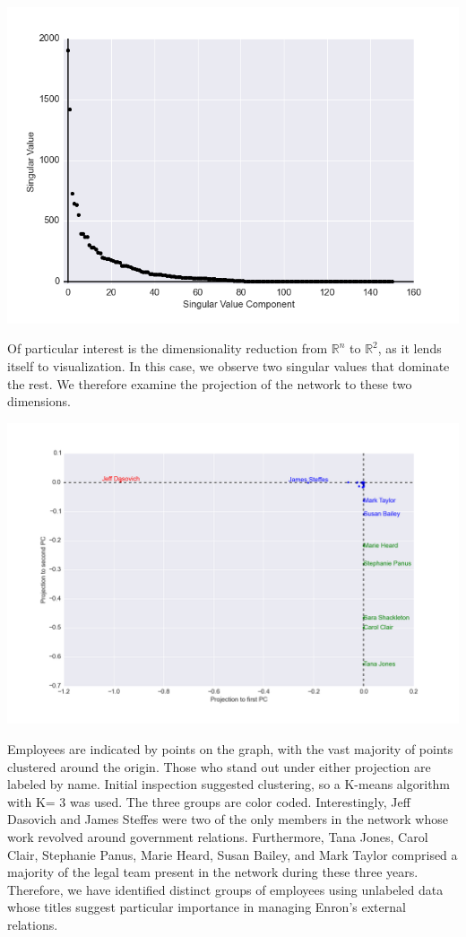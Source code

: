 \documentclass[12pt]{article}
\begin{document}
\includegraphics[width=1\textwidth]{SingularValues}

Of particular interest is the dimensionality reduction from $\mathbb{R}^n$ to $\mathbb{R}^2$, as it lends itself to visualization. In this case, we observe two singular values that dominate the rest. We therefore examine the projection of the network to these two dimensions.

\includegraphics[width=1\textwidth]{ProjectionPC}

Employees are indicated by points on the graph, with the vast majority of points clustered around the origin. Those who stand out under either projection are labeled by name. Initial inspection suggested  clustering, so a K-means algorithm with K= 3 was used. The three groups are color coded. Interestingly, Jeff Dasovich and James Steffes were two of the only members in the network whose work revolved around government relations. Furthermore, Tana Jones, Carol Clair, Stephanie Panus, Marie Heard, Susan Bailey, and Mark Taylor comprised a majority of the legal team present in the network during these three years. Therefore, we have identified distinct groups of employees using unlabeled data whose titles suggest particular importance in managing Enron's external relations.
\end{document}
